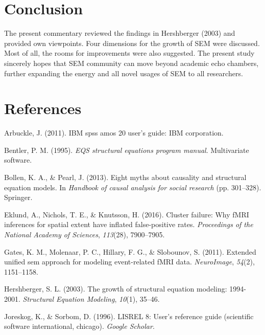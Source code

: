 \documentclass[jou]{apa6}
\theoremstyle{definition}
\theoremstyle{definition}
\theoremstyle{definition}
\theoremstyle{remark}
\begin{document}
\hypertarget{conclusion}{%
\section{Conclusion}\label{conclusion}}

\noindent The present commentary reviewed the findings in Hershberger
(2003) and provided own viewpoints. Four dimensions for the growth of
SEM were discussed. Most of all, the rooms for improvements were also
suggested. The present study sincerely hopes that SEM community can move
beyond academic echo chambers, further expanding the energy and all
novel usages of SEM to all researchers.

\newpage

\hypertarget{references}{%
\section{References}\label{references}}

\setlength{\parindent}{-0.5in}
\setlength{\leftskip}{0.5in}

\hypertarget{refs}{}
\leavevmode\hypertarget{ref-arbuckle2011ibm}{}%
Arbuckle, J. (2011). IBM spss amos 20 user's guide: IBM corporation.

\leavevmode\hypertarget{ref-bentler1995eqs}{}%
Bentler, P. M. (1995). \emph{EQS structural equations program manual}.
Multivariate software.

\leavevmode\hypertarget{ref-bollen2013eight}{}%
Bollen, K. A., \& Pearl, J. (2013). Eight myths about causality and
structural equation models. In \emph{Handbook of causal analysis for
social research} (pp. 301--328). Springer.

\leavevmode\hypertarget{ref-eklund2016cluster}{}%
Eklund, A., Nichols, T. E., \& Knutsson, H. (2016). Cluster failure: Why
fMRI inferences for spatial extent have inflated false-positive rates.
\emph{Proceedings of the National Academy of Sciences}, \emph{113}(28),
7900--7905.

\leavevmode\hypertarget{ref-gates2011extended}{}%
Gates, K. M., Molenaar, P. C., Hillary, F. G., \& Slobounov, S. (2011).
Extended unified sem approach for modeling event-related fMRI data.
\emph{NeuroImage}, \emph{54}(2), 1151--1158.

\leavevmode\hypertarget{ref-hershberger2003growth}{}%
Hershberger, S. L. (2003). The growth of structural equation modeling:
1994-2001. \emph{Structural Equation Modeling}, \emph{10}(1), 35--46.

\leavevmode\hypertarget{ref-joreskog1996lisrel}{}%
Joreskog, K., \& Sorbom, D. (1996). LISREL 8: User's reference guide
(scientific software international, chicago). \emph{Google Scholar}.
\end{document}
